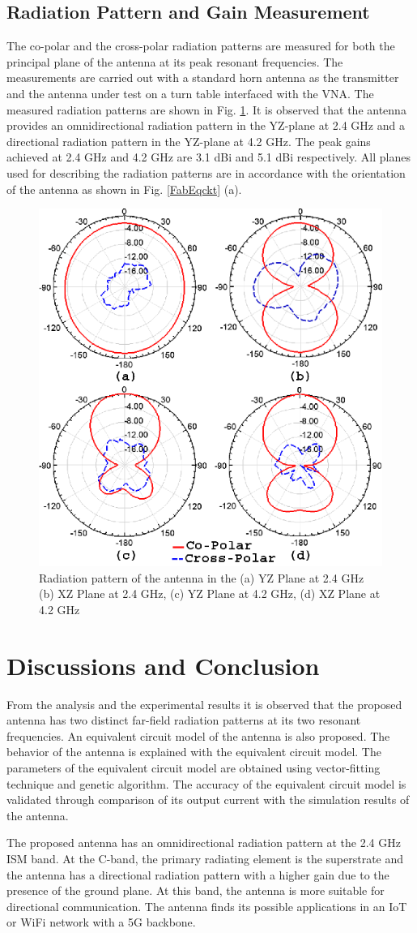 \subsection{Radiation Pattern and Gain Measurement}
The co-polar and the cross-polar radiation patterns are measured for both the principal plane of the antenna at its peak resonant frequencies. The measurements are carried out with a standard horn antenna as the transmitter and the antenna under test on a turn table interfaced with the VNA. The measured radiation patterns are shown in Fig. \ref{fig-pat}. It is observed that the antenna provides an omnidirectional radiation pattern in the YZ-plane at 2.4 GHz and a directional radiation pattern in the YZ-plane at 4.2 GHz. The peak gains achieved at 2.4 GHz and 4.2 GHz are 3.1 dBi and 5.1 dBi respectively. All planes used for describing the radiation patterns are in accordance with the orientation of the antenna as shown in Fig. \ref{FabEqckt} (a).

\begin{figure}[h]
\centering
\includegraphics[width=0.5\linewidth]{Fig-aeue_7.eps}
\caption{Radiation pattern of the antenna in the (a) YZ Plane at 2.4 GHz (b) XZ Plane at 2.4 GHz, (c) YZ Plane at 4.2 GHz, (d) XZ Plane at 4.2 GHz}\label{fig-pat}
\end{figure}

\section{Discussions and Conclusion}\label{sec:concl}
From the analysis and the experimental results it is observed that the proposed antenna has two distinct far-field radiation patterns at its two resonant frequencies. An equivalent circuit model of the antenna is also proposed. The behavior of the antenna is explained with the equivalent circuit model. The parameters of the equivalent circuit model are obtained using vector-fitting technique and genetic algorithm. The accuracy of the equivalent circuit model is validated through comparison of its output current with the simulation results of the antenna.

The proposed antenna has an omnidirectional radiation pattern at the 2.4 GHz ISM band. At the C-band, the primary radiating element is the superstrate and the antenna has a directional radiation pattern with a higher gain due to the presence of the ground plane. At this band, the antenna is more suitable for directional communication. The antenna finds its possible applications in an IoT or WiFi network with a 5G backbone. 